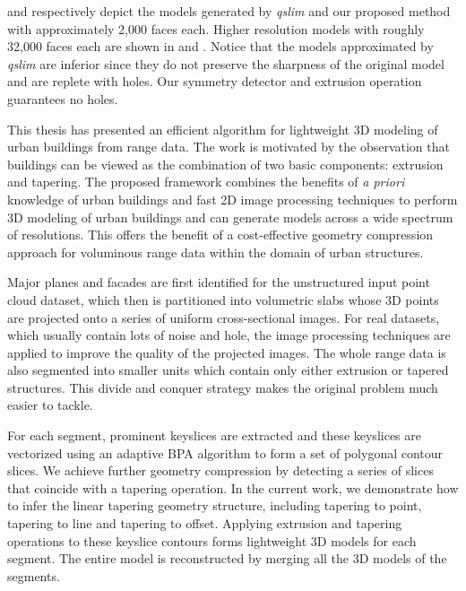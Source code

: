  and  respectively depict the models generated
by {\it qslim} and our proposed method with approximately 2,000 faces each.
Higher resolution models with roughly 32,000 faces each are shown in
 and .
Notice that the models approximated by {\it qslim} are inferior since they
do not preserve the sharpness of the original model and are replete with holes.
Our symmetry detector and extrusion operation guarantees no holes.


This thesis has presented an efficient algorithm
for lightweight 3D modeling of urban buildings from range data.
The work is motivated by the observation that buildings can be viewed as the
combination of two basic components: extrusion and tapering.
The proposed framework combines the benefits of
\emph{a priori} knowledge of urban buildings and fast 2D image
processing techniques to perform 3D modeling of urban buildings
and can generate models across a wide spectrum of resolutions.
This offers the benefit of a cost-effective geometry compression
approach for voluminous range data within the domain of urban structures.

Major planes and facades are first identified for the unstructured
input point cloud dataset,
which then is partitioned into volumetric slabs
whose 3D points are projected onto a series of uniform cross-sectional images.
For real datasets, which usually contain lots of noise and hole,
the image processing techniques are applied
to improve the quality of the projected images.
The whole range data is also segmented into smaller units which
contain only either extrusion or tapered structures.
This divide and conquer strategy makes the original problem much easier to tackle.

For each segment, prominent keyslices are extracted
and these keyslices are vectorized using an adaptive BPA algorithm
to form a set of polygonal contour slices.
We achieve further geometry compression by detecting a series of
slices that coincide with a tapering operation.
In the current work, we demonstrate how to infer the linear tapering
geometry structure, including tapering to point, tapering to line and tapering to offset.
Applying extrusion and tapering operations to these keyslice contours
forms lightweight 3D models for each segment.
The entire model is reconstructed by
merging all the 3D models of the segments.


